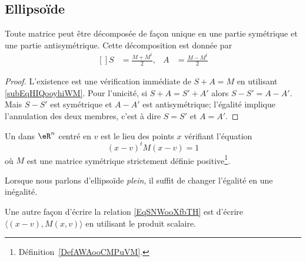 \subsection{Ellipsoïde}

\begin{lemma}   \label{LemYVWoohcjIX}
    Toute matrice peut être décomposée de façon unique en une partie symétrique et une partie antisymétrique. Cette décomposition est donnée par
\begin{equation}\label{subEqHIQooyhiWM}
    \begin{aligned}[]
            S&=\frac{ M+M^t }{ 2 },&A&=\frac{ M-M^t }{ 2 }
    \end{aligned}
\end{equation}
\end{lemma}

\begin{proof}
    L'existence est une vérification immédiate de \( S+A=M\) en utilisant \eqref{subEqHIQooyhiWM}. Pour l'unicité, si \( S+A=S'+A'\) alors \( S-S'=A-A'\). Mais \( S-S'\) est symétrique et \( A-A'\) est antisymétrique; l'égalité implique l'annulation des deux membres, c'est à dire \( S=S'\) et \( A=A'\).
\end{proof}

\begin{definition}  \label{DefOEPooqfXsE}
    Un  dans \( \eR^n\) centré en \( v\) est le lieu des points \( x\) vérifiant l'équation
    \begin{equation}\label{EqSNWooXfbTH}
        (x-v)^t M(x-v)=1
    \end{equation}
    où \( M\) est une matrice symétrique strictement définie positive\footnote{Définition~\ref{DefAWAooCMPuVM}.}.

    Lorsque nous parlons d'ellipsoïde \emph{plein}, il suffit de changer l'égalité en une inégalité.
\end{definition}
Une autre façon d'écrire la relation \eqref{EqSNWooXfbTH} est d'écrire \( \langle (x-v),M(x,v)\rangle\) en utilisant le produit scalaire.

